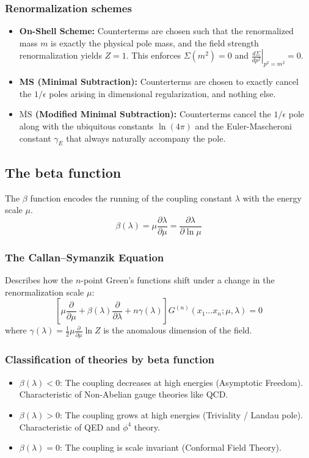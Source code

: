 \documentclass{article}
\begin{document}
\subsubsection*{Renormalization schemes}
\begin{itemize}
    \item \textbf{On-Shell Scheme:} Counterterms are chosen such that the renormalized mass $m$ is exactly the physical pole mass, and the field strength renormalization yields $Z=1$. This enforces $\Sigma(m^2) = 0$ and $\left.\frac{d\Sigma}{dp^2}\right|_{p^2=m^2} = 0$.
    \item \textbf{MS (Minimal Subtraction):} Counterterms are chosen to exactly cancel the $1/\epsilon$ poles arising in dimensional regularization, and nothing else.
    \item \textbf{$\overline{\text{MS}}$ (Modified Minimal Subtraction):} Counterterms cancel the $1/\epsilon$ pole along with the ubiquitous constants $\ln(4\pi)$ and the Euler-Mascheroni constant $\gamma_E$ that always naturally accompany the pole.
\end{itemize}
\subsection{The beta function}
The $\beta$ function encodes the running of the coupling constant $\lambda$ with the energy scale $\mu$.
\begin{equation}
    \beta(\lambda) = \mu \frac{\partial \lambda}{\partial \mu} = \frac{\partial \lambda}{\partial \ln \mu}
\end{equation}
\subsubsection*{The Callan–Symanzik Equation}
Describes how the $n$-point Green's functions shift under a change in the renormalization scale $\mu$:
\begin{equation}
    \left[ \mu \frac{\partial}{\partial \mu} + \beta(\lambda) \frac{\partial}{\partial \lambda} + n \gamma(\lambda) \right] G^{(n)}(x_1 \dots x_n; \mu, \lambda) = 0
\end{equation}
where $\gamma(\lambda) = \frac{1}{2} \mu \frac{\partial}{\partial \mu} \ln Z$ is the anomalous dimension of the field.
\subsubsection*{Classification of theories by beta function}
\begin{itemize}
    \item $\beta(\lambda) < 0$: The coupling decreases at high energies (Asymptotic Freedom). Characteristic of Non-Abelian gauge theories like QCD.
    \item $\beta(\lambda) > 0$: The coupling grows at high energies (Triviality / Landau pole). Characteristic of QED and $\phi^4$ theory.
    \item $\beta(\lambda) = 0$: The coupling is scale invariant (Conformal Field Theory).
\end{itemize}
\end{document}
